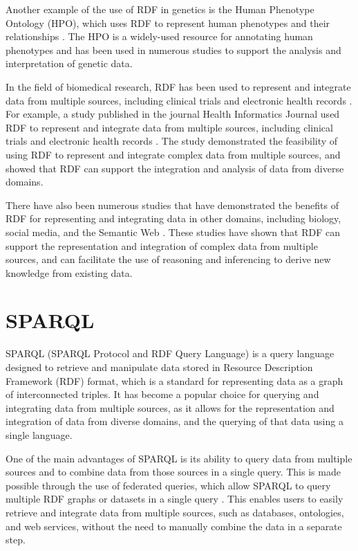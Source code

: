 Another example of the use of RDF in genetics is the Human Phenotype Ontology (HPO), which uses RDF to represent human phenotypes and their relationships \citep{robinson2010human}.  The HPO is a widely-used resource for annotating human phenotypes and has been used in numerous studies to support the analysis and interpretation of genetic data.

In the field of biomedical research, RDF has been used to represent and integrate data from multiple sources, including clinical trials and electronic health records \citep{luz2015providing}.  For example, a study published in the journal Health Informatics Journal used RDF to represent and integrate data from multiple sources, including clinical trials and electronic health records \citep{luz2015providing}.  The study demonstrated the feasibility of using RDF to represent and integrate complex data from multiple sources, and showed that RDF can support the integration and analysis of data from diverse domains.

There have also been numerous studies that have demonstrated the benefits of RDF for representing and integrating data in other domains, including biology, social media, and the Semantic Web \citep{schreiber2014rdf,allemang2011semantic,heath2011linked}.  These studies have shown that RDF can support the representation and integration of complex data from multiple sources, and can facilitate the use of reasoning and inferencing to derive new knowledge from existing data.

\section{SPARQL}

SPARQL (SPARQL Protocol and RDF Query Language) is a query language designed to retrieve and manipulate data stored in Resource Description Framework (RDF) format, which is a standard for representing data as a graph of interconnected triples\citep{prud2008sparql}.  It has become a popular choice for querying and integrating data from multiple sources, as it allows for the representation and integration of data from diverse domains, and the querying of that data using a single language.

One of the main advantages of SPARQL is its ability to query data from multiple sources and to combine data from those sources in a single query.  This is made possible through the use of federated queries, which allow SPARQL to query multiple RDF graphs or datasets in a single query \citep{allemang2011semantic,rakhmawati2013querying}.  This enables users to easily retrieve and integrate data from multiple sources, such as databases, ontologies, and web services, without the need to manually combine the data in a separate step.

